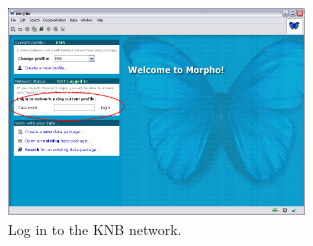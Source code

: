 \begin{figure}
  \centering
    \includegraphics[width=0.7\textwidth]{images/panel-login.jpg}
  \caption{Log in to the KNB network.}
  \label{fig:panel-login}
\end{figure}
